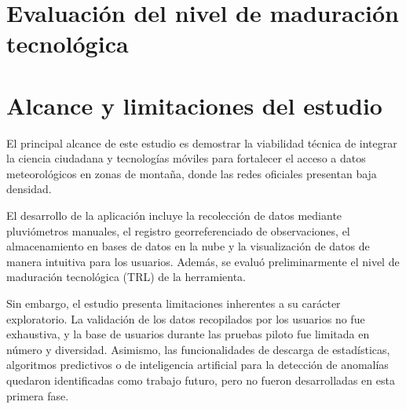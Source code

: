 























\section{Evaluación del nivel de maduración tecnológica}





























\section{Alcance y limitaciones del estudio}
El principal alcance de este estudio es demostrar la viabilidad técnica de integrar la ciencia ciudadana y tecnologías móviles para fortalecer el acceso a datos meteorológicos en zonas de montaña, donde las redes oficiales presentan baja densidad.

El desarrollo de la aplicación incluye la recolección de datos mediante pluviómetros manuales, el registro georreferenciado de observaciones, el almacenamiento en bases de datos en la nube y la visualización de datos de manera intuitiva para los usuarios. Además, se evaluó preliminarmente el nivel de maduración tecnológica (TRL) de la herramienta.

Sin embargo, el estudio presenta limitaciones inherentes a su carácter exploratorio. La validación de los datos recopilados por los usuarios no fue exhaustiva, y la base de usuarios durante las pruebas piloto fue limitada en número y diversidad. Asimismo, las funcionalidades de descarga de estadísticas, algoritmos predictivos o de inteligencia artificial para la detección de anomalías quedaron identificadas como trabajo futuro, pero no fueron desarrolladas en esta primera fase.